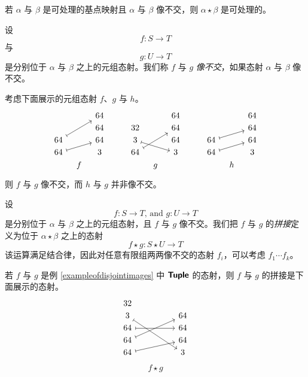 \begin{remark}
    若 $\alpha$ 与 $\beta$ 是可处理的基点映射且 $\alpha$ 与 $\beta$ 像不交，则 $\alpha \star \beta$ 是可处理的。 
\end{remark}

\begin{definition}\label{definitionofdisjointimagesinC} 设
\[
f:S \to T
\]
与
\[g:U \to T\]
是分别位于 $\alpha$ 与 $\beta$ 之上的元组态射。我们称 $f$ 与 $g$ {\it 像不交}，如果态射 $\alpha$ 与 $\beta$ 像不交。 
\end{definition}

\begin{example}\label{exampleofdisjointimages}
    考虑下面展示的元组态射 $f$、$g$ 与 $h$。 
    \[ \begin{tikzcd}[row sep = 1, column sep = 8]
    & & 64 & & & & & 64 & & & & & 64\\
     & & 64 & & & 32 & & 64 & & & & & 64\\
    64 \ar[rruu,mapsto] & & 64 & & &  3 \ar[rrd, mapsto] & & 64 & & & 64 \ar[urr,mapsto] & & 64\\
    64 \ar[rru,mapsto]& & 3 & & &  64 \ar[rruu,mapsto] & & 3 & & & 64 \ar[urr,mapsto] & & 3\\
    & f & & & & & g & & & & & h & \\
    \end{tikzcd} \]
    则 $f$ 与 $g$ 像不交，而 $h$ 与 $g$ 并非像不交。
\end{example}



\begin{construction}\label{constructionofflatconcatenation}
    设
    \[f:S \to T \text{, and }g:U \to T\]
    是分别位于 $\alpha$ 与 $\beta$ 之上的元组态射，且 $f$ 与 $g$ 像不交。我们把 $f$ 与 $g$ 的{\it 拼接}定义为位于 $\alpha \star \beta$ 之上的态射
    \[
    f \star g: S \star U \to T
    \]
    该运算满足结合律，因此对任意有限组两两像不交的态射 $f_i$，可以考虑 $f_1\cdots f_k$。 
\end{construction}

\begin{example}\label{exampleofconcatenation}
    若 $f$ 与 $g$ 是例 \ref{exampleofdisjointimages} 中 ${\boldsymbol{\mathsf{Tuple}}}$ 的态射，则 $f$ 与 $g$ 的拼接是下面展示的态射。 
    \[ \begin{tikzcd} [row sep = 1, column sep = 24]
    32 & & \\
    3 \ar[dddrr,mapsto]& & 64\\
    64 \ar[rr,mapsto] & & 64\\
    64 \ar[uurr,mapsto] & & 64 \\
    64 \ar[urr,mapsto] & & 3 \\
    \end{tikzcd} 
    \]
    \[ f \star g \]
\end{example}

